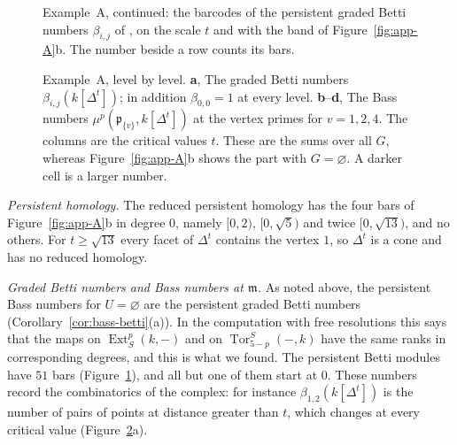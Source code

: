 \documentclass[11pt]{article}
\theoremstyle{plain}
\theoremstyle{definition}
\begin{document}
\begin{figure}[htbp]
\centering
{}
\caption{Example~A, continued: the barcodes of the persistent graded Betti numbers $\beta_{i,j}$ of \cite{SuwayyidWeiGraphs}, on the scale $t$ and with the band of Figure~\ref{fig:app-A}b. The number beside a row counts its bars.}\label{fig:app-A-betti}
\end{figure}

\begin{figure}[htbp]
\centering
{}
\caption{Example~A, level by level. \textbf{a}, The graded Betti numbers $\beta_{i,j}(k[\Delta^{t}])$; in addition $\beta_{0,0}=1$ at every level. \textbf{b}--\textbf{d}, The Bass numbers $\mu^p(\mathfrak{p}_{\{v\}},k[\Delta^{t}])$ at the vertex primes for $v=1,2,4$. The columns are the critical values $t$. These are the sums over all $G$, whereas Figure~\ref{fig:app-A}b shows the part with $G=\varnothing$. A darker cell is a larger number.}\label{fig:app-A-numbers}
\end{figure}

\emph{Persistent homology.} The reduced persistent homology has the four bars of Figure~\ref{fig:app-A}b in degree $0$, namely $[0,2)$, $[0,\sqrt5)$ and twice $[0,\sqrt{13})$, and no others. For $t\ge\sqrt{13}$ every facet of $\Delta^t$ contains the vertex $1$, so $\Delta^t$ is a cone and has no reduced homology.

\emph{Graded Betti numbers and Bass numbers at $\mathfrak{m}$.} As noted above, the persistent Bass numbers for $U=\varnothing$ are the persistent graded Betti numbers (Corollary~\ref{cor:bass-betti}(a)). In the computation with free resolutions this says that the maps on $\operatorname{Ext}^p_S(k,-)$ and on $\operatorname{Tor}^S_{5-p}(-,k)$ have the same ranks in corresponding degrees, and this is what we found. The persistent Betti modules have $51$ bars (Figure~\ref{fig:app-A-betti}), and all but one of them start at $0$. These numbers record the combinatorics of the complex: for instance $\beta_{1,2}(k[\Delta^t])$ is the number of pairs of points at distance greater than $t$, which changes at every critical value (Figure~\ref{fig:app-A-numbers}a).
\end{document}

